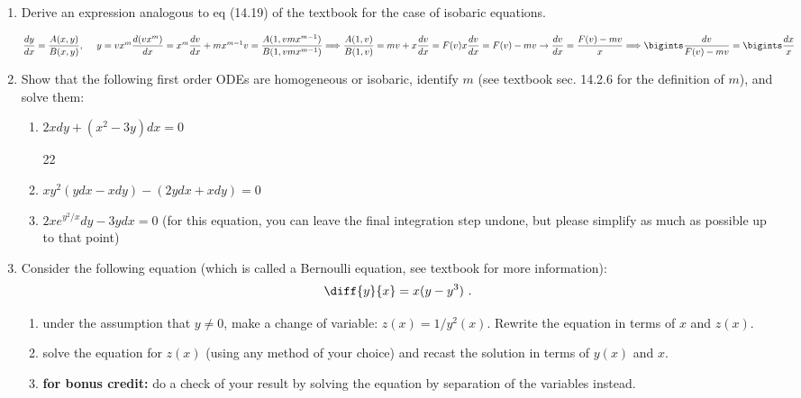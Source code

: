 \documentclass[fleqn]{article}
\begin{document}
  \begin{enumerate}

    \item  Derive an expression analogous to eq (14.19) of the textbook for the case of isobaric equations. 
    
      \textcolor{hwColor}{
        $
          \dfrac{dy}{dx}=\dfrac{A(x,y)}{B(x,y)}, ~~~~ y=vx^m \\
          \\
          \dfrac{d(vx^m)}{dx}=x^m\dfrac{dv}{dx}+mx^{m-1}v=\dfrac{A(1, vmx^{m-1})}{B(1, vmx^{m-1})} \\
          \\
          \Longrightarrow \dfrac{A(1,v)}{B(1,v)}=mv+x\dfrac{dv}{dx}=F(v) \\
          x\dfrac{dv}{dx}=F(v)-mv \rightarrow \dfrac{dv}{dx}=\dfrac{F(v)-mv}{x} \\
          \\
          \\
          \Longrightarrow \bigints \dfrac{dv}{F(v)-mv}=\bigints \dfrac{dx}{x}
        $    
      }

    
    \item  Show that the following first order ODEs are homogeneous or isobaric, identify $m$ (see textbook sec. 14.2.6 for the definition of $m$), and solve them:
      \begin{enumerate}
        \item $2xdy+(x^2-3y)dx=0$

        \textcolor{hwColor}{
          22
        }

        \item $x y^2 (y dx - x dy)-(2y dx + x dy)=0$
        
        \item $2x e^{y^2/x} dy - 3y dx=0$ (for this equation, you can leave the final integration step undone, but please simplify as much as possible up to that point)
      \end{enumerate}
    
    
    \item  Consider the following equation (which is called a Bernoulli equation, see textbook for more information): 
    \begin{equation}
    \diff{y}{x} = x  (y - y^3)~.
    \nonumber
    \end{equation}
    \begin{enumerate}
    \item under the assumption that $y\neq 0$, make a change of variable: $z(x)=1/y^2(x)$. Rewrite the equation in terms of $x$ and $z(x)$.
    
    \item solve the equation for $z(x)$ (using any method of your choice) and recast the solution in terms of $y(x)$ and $x$. 
    
    \item {\bf for bonus credit: } do a check of your result by solving the equation by separation of the variables instead. 
    \end{enumerate}
    
    \end{enumerate}
\end{document}
